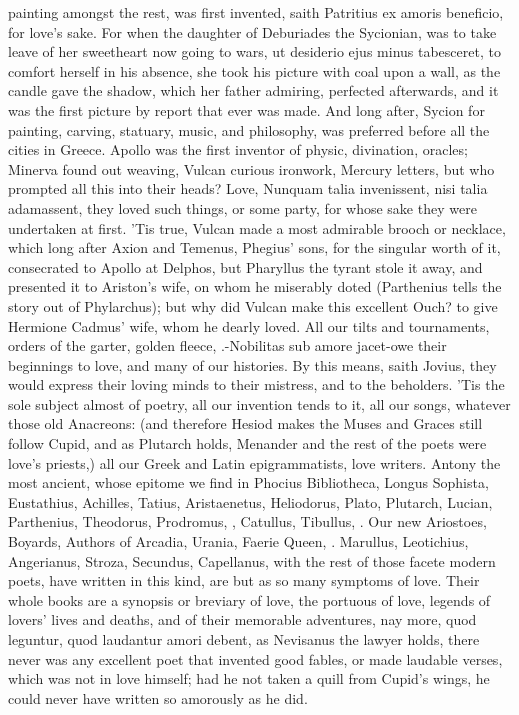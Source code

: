 painting amongst the rest, was first invented, saith Patritius ex
amoris beneficio, for love's sake. For when the daughter of
Deburiades the Sycionian, was to take leave of her sweetheart now
going to wars, ut desiderio ejus minus tabesceret, to comfort herself
in his absence, she took his picture with coal upon a wall, as the
candle gave the shadow, which her father admiring, perfected
afterwards, and it was the first picture by report that ever was made.
And long after, Sycion for painting, carving, statuary, music, and
philosophy, was preferred before all the cities in Greece. Apollo
was the first inventor of physic, divination, oracles; Minerva found
out weaving, Vulcan curious ironwork, Mercury letters, but who prompted
all this into their heads? Love, Nunquam talia invenissent, nisi talia
adamassent, they loved such things, or some party, for whose sake they
were undertaken at first. 'Tis true, Vulcan made a most admirable
brooch or necklace, which long after Axion and Temenus, Phegius' sons,
for the singular worth of it, consecrated to Apollo at Delphos, but
Pharyllus the tyrant stole it away, and presented it to Ariston's wife,
on whom he miserably doted (Parthenius tells the story out of
Phylarchus); but why did Vulcan make this excellent Ouch? to give
Hermione Cadmus' wife, whom he dearly loved. All our tilts and
tournaments, orders of the garter, golden fleece, \etc{}.-Nobilitas sub
amore jacet-owe their beginnings to love, and many of our histories. By
this means, saith Jovius, they would express their loving minds to
their mistress, and to the beholders. 'Tis the sole subject almost of
poetry, all our invention tends to it, all our songs, whatever those
old Anacreons: (and therefore Hesiod makes the Muses and Graces still
follow Cupid, and as Plutarch holds, Menander and the rest of the poets
were love's priests,) all our Greek and Latin epigrammatists, love
writers. Antony \Diogenes the most ancient, whose epitome we find in
Phocius Bibliotheca, Longus Sophista, Eustathius, Achilles, Tatius,
Aristaenetus, Heliodorus, Plato, Plutarch, Lucian, Parthenius,
Theodorus, Prodromus, \Ovid, Catullus, Tibullus, \etc{}. Our new Ariostoes,
Boyards, Authors of Arcadia, Urania, Faerie Queen, \etc{}. Marullus,
Leotichius, Angerianus, Stroza, Secundus, Capellanus, \etc{} with the rest
of those facete modern poets, have written in this kind, are but as so
many symptoms of love. Their whole books are a synopsis or breviary of
love, the portuous of love, legends of lovers' lives and deaths, and of
their memorable adventures, nay more, quod leguntur, quod laudantur
amori debent, as Nevisanus the lawyer holds, there never was any
excellent poet that invented good fables, or made laudable verses,
which was not in love himself; had he not taken a quill from Cupid's
wings, he could never have written so amorously as he did.

